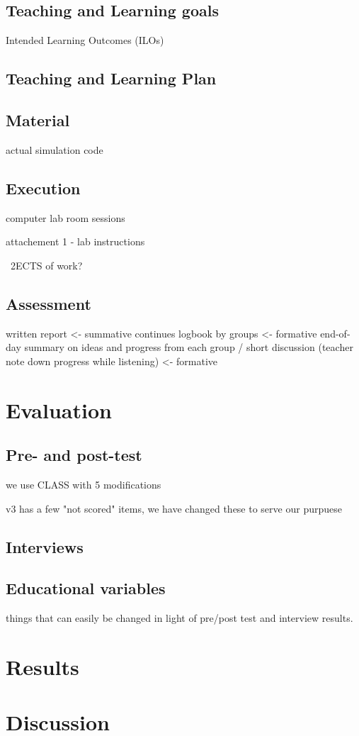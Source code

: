 \documentclass{article}
\begin{document}
\subsection{Teaching and Learning goals}

Intended Learning Outcomes (ILOs)

\subsection{Teaching and Learning Plan}


\subsection{Material}
actual simulation code

\subsection{Execution}

computer lab room sessions 

attachement
1 - lab instructions

~2ECTS of work?

\subsection{Assessment}

written report <- summative
continues logbook by groups <- formative
end-of-day summary on ideas and progress from each group / short discussion (teacher note down progress while listening) <- formative

\section{Evaluation}

\subsection{Pre- and post-test}

we use CLASS with 5 modifications

v3 has a few "not scored" items, we have changed these to serve our purpuese

\subsection{Interviews}

\subsection{Educational variables}

things that can easily be changed in light of pre/post test and interview results.

\section{Results}

\section{Discussion}
\end{document}
